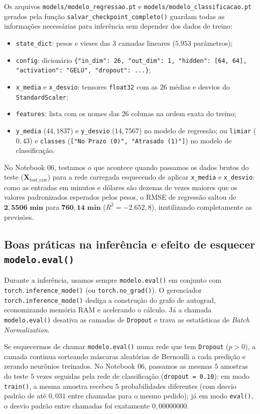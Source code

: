 \documentclass[12pt,a4paper]{article}
\begin{document}
Os arquivos \texttt{models/modelo\_regressao.pt} e \texttt{models/modelo\_classificacao.pt} gerados pela função \texttt{salvar\_checkpoint\_completo()} guardam todas as informações necessárias para inferência sem depender dos dados de treino:
\begin{itemize}
    \item \texttt{state\_dict}: pesos e vieses das $3$ camadas lineares ($5.953$ parâmetros);
    \item \texttt{config}: dicionário \texttt{\{"in\_dim": 26, "out\_dim": 1, "hidden": [64, 64], "activation": "GELU", "dropout": ...\}};
    \item \texttt{x\_media} e \texttt{x\_desvio}: tensores \texttt{float32} com as $26$ médias e desvios do \texttt{StandardScaler};
    \item \texttt{features}: lista com os nomes das $26$ colunas na ordem exata do treino;
    \item \texttt{y\_media} ($44{,}1837$) e \texttt{y\_desvio} ($14{,}7567$) no modelo de regressão; ou \texttt{limiar} ($0{,}43$) e \texttt{classes} (\texttt{["No Prazo (0)", "Atrasado (1)"]}) no modelo de classificação.
\end{itemize}

No Notebook 06, testamos o que acontece quando passamos os dados brutos do teste ($\mathbf{X}_{\text{test\_raw}}$) para a rede carregada esquecendo de aplicar \texttt{x\_media} e \texttt{x\_desvio}: como as entradas em minutos e dólares são dezenas de vezes maiores que os valores padronizados esperados pelos pesos, o RMSE de regressão saltou de $\mathbf{2{,}5506\text{ min}}$ para $\mathbf{760{,}14\text{ min}}$ ($R^2 = -2.652{,}8$), inutilizando completamente as previsões.

\subsection{Boas práticas na inferência e efeito de esquecer \texttt{modelo.eval()}}

Durante a inferência, usamos sempre \texttt{modelo.eval()} em conjunto com \texttt{torch.inference\_mode()} (ou \texttt{torch.no\_grad()}). O gerenciador \texttt{torch.inference\_mode()} desliga a construção do grafo de autograd, economizando memória RAM e acelerando o cálculo. Já a chamada \texttt{modelo.eval()} desativa as camadas de \texttt{Dropout} e trava as estatísticas de \textit{Batch Normalization}.

Se esquecermos de chamar \texttt{modelo.eval()} numa rede que tem \texttt{Dropout} ($p > 0$), a camada continua sorteando máscaras aleatórias de Bernoulli a cada predição e zerando neurônios treinados. No Notebook 06, passamos as mesmas $5$ amostras do teste $5$ vezes seguidas pela rede de classificação (\texttt{dropout = 0.10}): em modo \texttt{train()}, a mesma amostra recebeu $5$ probabilidades diferentes (com desvio padrão de até $0{,}031$ entre chamadas para o mesmo pedido); já em modo \texttt{eval()}, o desvio padrão entre chamadas foi exatamente $0{,}00000000$.
\end{document}
